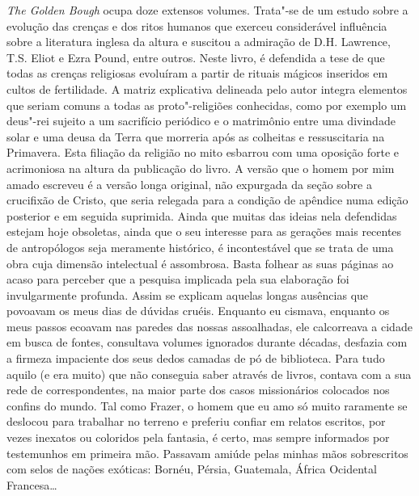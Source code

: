 \emph{The Golden Bough }ocupa doze extensos volumes. Trata"-se de um
estudo sobre a evolução das crenças e dos ritos humanos que exerceu
considerável influência sobre a literatura inglesa da altura e suscitou
a admiração de D.H. Lawrence,
T.S. Eliot e Ezra Pound, entre outros. Neste livro, é defendida a tese
de que todas as crenças religiosas evoluíram a partir de rituais mágicos
inseridos em cultos de fertilidade. A matriz explicativa delineada pelo
autor integra elementos que seriam comuns a todas as proto"-religiões
conhecidas, como por exemplo um deus"-rei sujeito a um sacrifício
periódico e o matrimônio entre uma divindade solar e uma deusa da Terra
que morreria após as colheitas e ressuscitaria na Primavera. Esta
filiação da religião no mito esbarrou com uma oposição forte e
acrimoniosa na altura da publicação do livro. A versão que o homem por
mim amado escreveu é a versão longa original, não expurgada da seção
sobre a crucifixão de Cristo, que seria relegada para a condição de
apêndice numa edição posterior e em seguida suprimida. Ainda que muitas
das ideias nela defendidas estejam hoje obsoletas, ainda que o seu
interesse para as gerações mais recentes de antropólogos seja meramente
histórico, é incontestável que se trata de uma
obra cuja dimensão intelectual é assombrosa. Basta folhear as suas
páginas ao acaso para perceber que a pesquisa implicada pela sua
elaboração foi invulgarmente profunda. Assim se explicam aquelas
longas ausências que povoavam os meus dias de dúvidas cruéis. Enquanto
eu cismava, enquanto os meus passos ecoavam nas paredes das nossas
assoalhadas, ele calcorreava a cidade em busca de fontes, consultava
volumes ignorados durante décadas, desfazia com a firmeza impaciente dos
seus dedos camadas de pó de biblioteca. Para tudo aquilo (e era muito)
que não conseguia saber através de livros, contava com a sua rede de
correspondentes, na maior parte dos casos missionários colocados nos
confins do mundo. Tal como Frazer, o homem que eu amo só muito raramente
se deslocou para trabalhar no terreno e preferiu confiar em relatos
escritos, por vezes inexatos ou coloridos pela fantasia, é certo, mas
sempre informados por testemunhos em primeira mão. Passavam amiúde
pelas minhas mãos sobrescritos com selos de nações exóticas: Bornéu,
Pérsia, Guatemala, África Ocidental Francesa\ldots{}

